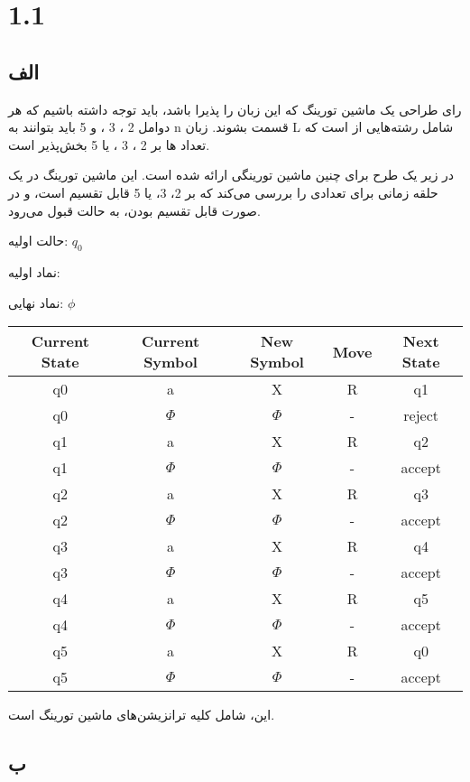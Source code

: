 \section*{1.1}

\subsection*{الف}

رای طراحی یک ماشین تورینگ که این زبان را پذیرا باشد، باید توجه داشته باشیم که هر دوامل 2 ، 3 ، و 5 باید بتوانند به n قسمت بشوند. زبان L شامل رشته‌هایی از
است که تعداد 
‌ها بر 2 ، 3 ، یا 5 بخش‌پذیر است.

در زیر یک طرح برای چنین ماشین تورینگی ارائه شده است. این ماشین تورینگ در یک حلقه زمانی برای تعدادی
را بررسی می‌کند که بر 2، 3، یا 5 قابل تقسیم است، و در صورت قابل تقسیم بودن، به حالت قبول می‌رود.

حالت اولیه:
$q_0$

نماد اولیه:

نماد نهایی: 
$\phi$

\begin{tabular}{|c|c|c|c|c|}
	\hline
	Current State & Current Symbol & New Symbol & Move & Next State \\
	\hline
	q0 & a & X & R & q1 \\
	q0 & $\Phi$ & $\Phi$ & - & reject \\
	q1 & a & X & R & q2 \\
	q1 & $\Phi$ & $\Phi$ & - & accept \\
	q2 & a & X & R & q3 \\
	q2 & $\Phi$ & $\Phi$ & - & accept \\
	q3 & a & X & R & q4 \\
	q3 & $\Phi$ & $\Phi$ & - & accept \\
	q4 & a & X & R & q5 \\
	q4 & $\Phi$ & $\Phi$ & - & accept \\
	q5 & a & X & R & q0 \\
	q5 & $\Phi$ & $\Phi$ & - & accept \\
	
	\hline
\end{tabular}

این، شامل کلیه ترانزیشن‌های ماشین تورینگ است.

\subsection*{ب}

